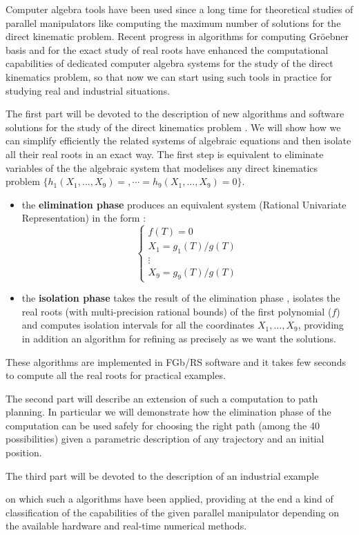 \documentclass[11pt]{article}
\begin{document}
Computer algebra tools have been used since a long time
for theoretical studies of parallel manipulators like computing
the maximum number of solutions for the direct kinematic problem.
Recent progress in algorithms for computing Gr\"oebner basis
and for the exact study of real roots have enhanced the computational
capabilities of dedicated computer algebra systems for the study
of the direct kinematics problem, so that now we can start using such
tools in practice for studying real and industrial situations.

The first part will be devoted to the description of
new algorithms and software solutions for the study of the direct
kinematics problem .
We will show how we can simplify efficiently the related systems of
algebraic equations and then isolate all their real roots in an exact
way. The first step is equivalent to eliminate variables of the
 the algebraic system that modelises any direct kinematics problem
 $\{h_1(X_1,\ldots , X_9)=,\cdots =h_9(X_1,\ldots , X_9)=0\}$.


\begin{itemize}
\item the {\bf elimination phase} produces an equivalent system
(Rational Univariate Representation) in the form :
$$
\left \{
\begin{array}{l}
f(T)=0 \\
X_1=g_1(T)/g(T)\\
\vdots \\
X_9=g_9(T)/g(T)
\end{array}
\right .
$$

\item the {\bf isolation phase} takes the result of the elimination
phase , isolates the real roots (with multi-precision rational bounds)
of the first polynomial ($f$) and computes isolation intervals for all
the coordinates $X_1,\ldots,X_9$, providing in addition an algorithm
for refining as precisely as we want the solutions.
\end{itemize}

These algorithms are implemented in FGb/RS software and it takes few
seconds to compute all the real roots for practical examples.

The second part will describe an extension of such a computation to path
planning. In particular we will demonstrate how the elimination phase
of the computation can be used safely for choosing the right path (among
the 40 possibilities) given a parametric description of any trajectory
and an initial position.

The third part will be devoted to the description of an industrial example

on which such a algorithms have been applied, providing at the end a kind
of
classification of the capabilities of the given parallel manipulator
depending on the available hardware and real-time numerical methods.
\end{document}

